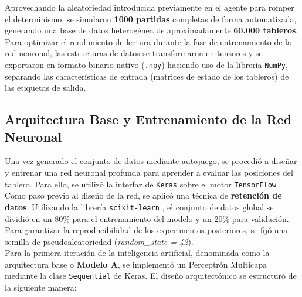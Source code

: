 \documentclass[conference]{IEEEtran}
\begin{document}
\vspace{0.25cm}
Aprovechando la aleatoriedad introducida previamente en el agente para romper el determinismo, se simularon \textbf{1000 partidas} completas de forma automatizada, generando una base de 
datos heterogénea de aproximadamente \textbf{60.000 tableros}.\\

Para optimizar el rendimiento de lectura durante la fase de entrenamiento de la red neuronal, las estructuras de datos se transformaron 
en tensores y se exportaron en formato binario nativo (\texttt{.npy}) haciendo uso de la librería \texttt{NumPy}, separando las características 
de entrada (matrices de estado de los tableros) de las etiquetas de salida.\\

\subsection{Arquitectura Base y Entrenamiento de la Red Neuronal}
Una vez generado el conjunto de datos mediante autojuego, se procedió a diseñar y entrenar una red neuronal profunda para aprender a evaluar las posiciones del tablero. Para ello, se utilizó la
interfaz de \texttt{Keras} \cite{keras} sobre el motor \texttt{TensorFlow} \cite{tensorflow}.\\ 

Como paso previo al diseño de la red, se aplicó una técnica de \textbf{retención de datos}. Utilizando la librería \texttt{scikit-learn} \cite{scikit-learn}, el conjunto de datos 
global se dividió en un 80\% para el entrenamiento del modelo y un 20\% para validación. Para garantizar la reproducibilidad 
de los experimentos posteriores, se fijó una semilla de pseudoaleatoriedad (\textit{random\_state = 42}).\\

Para la primera iteración de la inteligencia artificial, denominada como la arquitectura base o \textbf{Modelo A}, se implementó un Perceptrón Multicapa mediante 
la clase \texttt{Sequential} de Keras. El diseño arquitectónico se estructuró de la siguiente manera:\\
\end{document}

